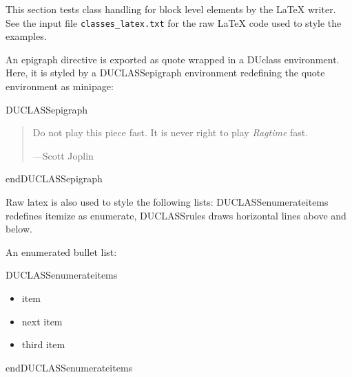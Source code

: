 \documentclass[a4paper]{memoir}
\newenvironment{DUclass}[1]%
  {%
   \def\DocutilsClassFunctionName{DUCLASS#1}
     \csname \DocutilsClassFunctionName \endcsname}%
  {\csname end\DocutilsClassFunctionName \endcsname}%
\begin{document}
This section tests class handling for block level elements by the LaTeX
writer. See the input file \texttt{classes\_latex.txt} for the raw LaTeX code used
to style the examples.

An \textquotedbl{}epigraph\textquotedbl{} directive is exported as \textquotedbl{}quote\textquotedbl{} wrapped in a \textquotedbl{}DUclass\textquotedbl{}
environment. Here, it is styled by a \textquotedbl{}DUCLASSepigraph\textquotedbl{} environment
redefining the \textquotedbl{}quote\textquotedbl{} environment as \textquotedbl{}minipage\textquotedbl{}:

\newcommand*{\DUCLASSepigraph}{%
  \renewenvironment{quote}{\vspace{1em}
                           \footnotesize\hfill{}%
                           \begin{minipage}{0.4\columnwidth}}%
                          {\end{minipage}\vskip\baselineskip}}

\begin{DUclass}{epigraph}
\begin{quote}
Do not play this piece fast. It is never right to play \emph{Ragtime} fast.
\nopagebreak

\raggedleft —Scott Joplin
\end{quote}
\end{DUclass}

Raw latex is also used to style the following lists: \textquotedbl{}DUCLASSenumerateitems\textquotedbl{}
redefines \textquotedbl{}itemize\textquotedbl{} as \textquotedbl{}enumerate\textquotedbl{}, \textquotedbl{}DUCLASSrules\textquotedbl{} draws horizontal lines
above and below.

\newcommand*{\DUCLASSenumerateitems}{%
  \renewenvironment{itemize}{\begin{enumerate}}%
                            {\end{enumerate}}%
}

\newenvironment{DUCLASSrules}%
               {\noindent\rule[0.5ex]{1\columnwidth}{1pt}}%
               {\noindent\rule[0.5ex]{1\columnwidth}{1pt}}

An \textquotedbl{}enumerated\textquotedbl{} bullet list:

\begin{DUclass}{enumerateitems}
\begin{itemize}
\item item

\item next item

\item third item
\end{itemize}
\end{DUclass}
\end{document}
